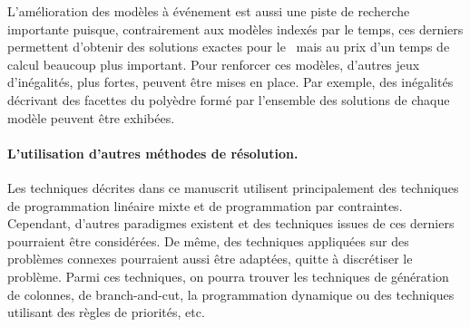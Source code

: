 L'amélioration des modèles à événement est aussi une piste de
recherche importante puisque, contrairement aux modèles indexés par le
temps, ces derniers permettent d'obtenir des solutions exactes pour le
\CECSP~mais au prix d'un temps de calcul beaucoup plus important. Pour
renforcer ces modèles, d'autres jeux d'inégalités, plus fortes,
peuvent être mises en place. Par exemple, des inégalités décrivant des
facettes du polyèdre formé par l'ensemble des solutions de chaque
modèle peuvent être exhibées.

\paragraph{L'utilisation d'autres méthodes de résolution.}
Les techniques décrites dans ce manuscrit utilisent principalement des
techniques de programmation linéaire mixte et de programmation par
contraintes. Cependant, d'autres paradigmes existent et des techniques
issues de ces derniers pourraient être considérées. De même, des
techniques appliquées sur des problèmes connexes pourraient aussi être
adaptées, quitte à discrétiser le problème. Parmi ces techniques, on
pourra trouver les techniques de génération de colonnes, de
branch-and-cut, la programmation dynamique ou des techniques utilisant
des règles de priorités, etc. 








